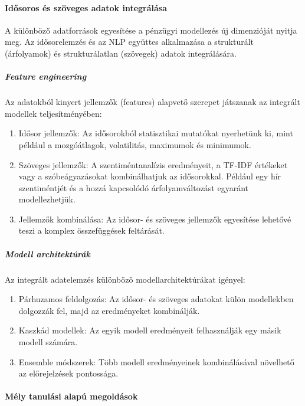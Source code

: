 \documentclass[11pt]{article}
\begin{document}
\paragraph{Idősoros és szöveges adatok
integrálása}\label{idux151soros-uxe9s-szuxf6veges-adatok-integruxe1luxe1sa}

A különböző adatforrások egyesítése a pénzügyi modellezés új dimenzióját
nyitja meg. Az idősorelemzés és az NLP együttes alkalmazása a
strukturált (árfolyamok) és strukturálatlan (szövegek) adatok
integrálására.

\subparagraph{Feature engineering}\label{feature-engineering}

Az adatokból kinyert jellemzők (features) alapvető szerepet játszanak az
integrált modellek teljesítményében:

\begin{enumerate}
\def\labelenumi{\arabic{enumi}.}
\item
  Idősor jellemzők: Az idősorokból statisztikai mutatókat nyerhetünk ki,
  mint például a mozgóátlagok, volatilitás, maximumok és minimumok.
\item
  Szöveges jellemzők: A szentiméntanalízis eredményeit, a TF-IDF
  értékeket vagy a szóbeágyazásokat kombinálhatjuk az idősorokkal.
  Például egy hír szentiméntjét és a hozzá kapcsolódó árfolyamváltozást
  egyaránt modellezhetjük.
\item
  Jellemzők kombinálása: Az idősor- és szöveges jellemzők egyesítése
  lehetővé teszi a komplex összefüggések feltárását.
\end{enumerate}

\subparagraph{Modell architektúrák}\label{modell-architektuxfaruxe1k}

Az integrált adatelemzés különböző modellarchitektúrákat igényel:

\begin{enumerate}
\def\labelenumi{\arabic{enumi}.}
\item
  Párhuzamos feldolgozás: Az idősor- és szöveges adatokat külön
  modellekben dolgozzák fel, majd az eredményeket kombinálják.
\item
  Kaszkád modellek: Az egyik modell eredményeit felhasználják egy másik
  modell számára.
\item
  Ensemble módszerek: Több modell eredményeinek kombinálásával növelhető
  az előrejelzések pontossága.
\end{enumerate}

\paragraph{Mély tanulási alapú
megoldások}\label{muxe9ly-tanuluxe1si-alapuxfa-megolduxe1sok}
\end{document}
